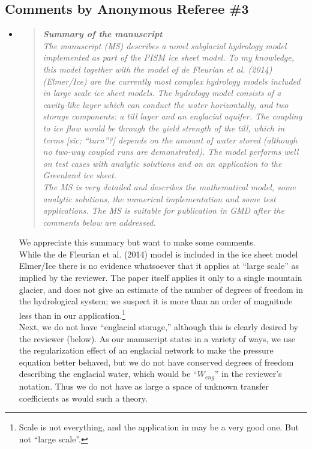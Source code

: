 \documentclass[11pt,reqno]{amsart}
\newcommand{\reply}[2]{
\medskip\medskip
\item  \begin{quote}
\emph{#1}
\end{quote}

\medskip
\noindent #2}
\begin{document}
\subsection*{Comments by Anonymous Referee \#3}\begin{itemize}
\reply{\textbf{Summary of the manuscript}\\
The manuscript (MS) describes a novel subglacial hydrology model implemented as
part of the PISM ice sheet model. To my knowledge, this model together with the
model of de Fleurian et al. (2014) (Elmer/Ice) are the currently most complex hydrology
models included in large scale ice sheet models. The hydrology model consists of a
cavity-like layer which can conduct the water horizontally, and two storage components:
a till layer and an englacial aquifer. The coupling to ice flow would be through the yield
strength of the till, which in terms [sic; ``turn''?] depends on the amount of water stored (although no
two-way coupled runs are demonstrated). The model performs well on test cases with
analytic solutions and on an application to the Greenland ice sheet.\\
\indent The MS is very detailed and describes the mathematical model, some analytic solutions, the numerical implementation and some test applications. The MS is suitable for
publication in GMD after the comments below are addressed.}
{We appreciate this summary but want to make some comments. \\
\indent While the de Fleurian et al. (2014) \cite{deFleurianetal2014} model is included in the ice sheet model Elmer/Ice there is no evidence whatsoever that it applies at ``large scale'' as implied by the reviewer.  The paper \cite{deFleurianetal2014} itself applies it only to a single mountain glacier, and does not give an estimate of the number of degrees of freedom in the hydrological system; we suspect it is more than an order of magnitude less than in our application.\footnote{Scale is not everything, and the application in \cite{deFleurianetal2014} may be a very good one.  But not ``large scale''.} \\
\indent Next, we do not have ``englacial storage,'' although this is clearly desired by the reviewer (below).  As our manuscript states in a variety of ways, we use the regularization effect of an englacial network to make the pressure equation better behaved, but we do not have conserved degrees of freedom describing the englacial water, which would be ``$W_{eng}$'' in the reviewer's notation.  Thus we do not have as large a space of unknown transfer coefficients as would such a theory.}


\end{itemize}
\end{document}
